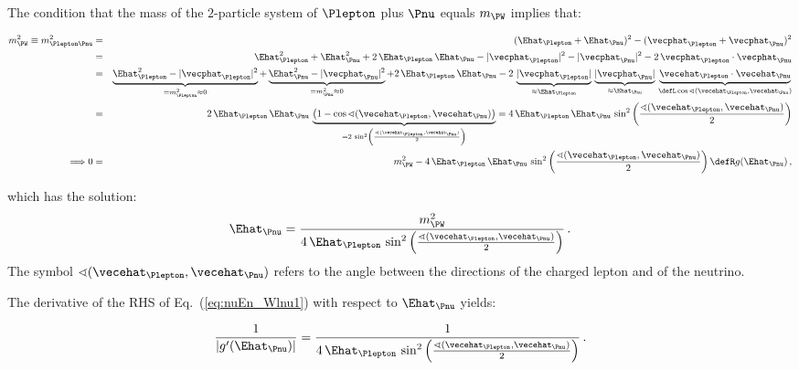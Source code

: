 The condition that the mass of the $2$-particle system of $\Plepton$ plus $\Pnu$ equals $m_{\PW}$ implies that:
\begin{linenowrapper}
\begin{eqnarray}
m_{\PW}^{2} \equiv m_{\Plepton\Pnu}^{2} 
 & = & ( \Ehat_{\Plepton} + \Ehat_{\Pnu} )^{2} - ( \vecphat_{\Plepton} + \vecphat_{\Pnu} )^{2} \nonumber \\
 & = & \Ehat_{\Plepton}^{2} + \Ehat_{\Pnu}^{2} + 2 \, \Ehat_{\Plepton} \, \Ehat_{\Pnu} 
- |\vecphat_{\Plepton}|^{2} - |\vecphat_{\Pnu}|^{2} - 2 \, \vecphat_{\Plepton} \cdot \vecphat_{\Pnu} \nonumber \\
 & = & \underbrace{\Ehat_{\Plepton}^{2} - |\vecphat_{\Plepton}|^{2}}_{= m_{\Plepton}^{2} \approx 0} 
+ \underbrace{\Ehat_{\Pnu}^{2} - |\vecphat_{\Pnu}|^{2}}_{= m_{\Pnu}^{2} \approx 0} 
+ 2 \, \Ehat_{\Plepton} \, \Ehat_{\Pnu} 
- 2 \, \underbrace{|\vecphat_{\Plepton}|}_{\approx \Ehat_{\Plepton}} \, \underbrace{|\vecphat_{\Pnu}|}_{\approx \Ehat_{\Pnu}} \, 
 \underbrace{\vecehat_{\Plepton} \cdot \vecehat_{\Pnu}}_{\defL \cos\sphericalangle(\vecehat_{\Plepton},\vecehat_{\Pnu})} \nonumber \\
 & = & 2 \, \Ehat_{\Plepton} \, \Ehat_{\Pnu} \, 
  \underbrace{\left(1 - \cos\sphericalangle(\vecehat_{\Plepton},\vecehat_{\Pnu})\right)}_{= 2 \, \sin^{2}\left(\frac{\sphericalangle(\vecehat_{\Plepton},\vecehat_{\Pnu})}{2}\right)} 
   = 4 \, \Ehat_{\Plepton} \, \Ehat_{\Pnu} \, \sin^{2}\left(\frac{\sphericalangle(\vecehat_{\Plepton},\vecehat_{\Pnu})}{2}\right) \nonumber \\
\Longrightarrow 0 & = & m_{\PW}^{2} - 4 \, \Ehat_{\Plepton} \, \Ehat_{\Pnu} \, \sin^{2}\left(\frac{\sphericalangle(\vecehat_{\Plepton},\vecehat_{\Pnu})}{2}\right)
  \defR g(\Ehat_{\Pnu}) \, ,
\label{eq:nuEn_Wlnu1}
\end{eqnarray}
\end{linenowrapper}
which has the solution:
\begin{equation}
\Ehat_{\Pnu} = \frac{m_{\PW}^{2}}{4 \, \Ehat_{\Plepton} \, \sin^{2}\left(\frac{\sphericalangle(\vecehat_{\Plepton},\vecehat_{\Pnu})}{2}\right)} \, .
\label{eq:nuEn_Wlnu2}
\end{equation}
The symbol $\sphericalangle(\vecehat_{\Plepton},\vecehat_{\Pnu})$ refers to the angle between the directions of the charged lepton and of the neutrino.

The derivative of the RHS of Eq.~(\ref{eq:nuEn_Wlnu1}) with respect to $\Ehat_{\Pnu}$ yields:
\begin{linenowrapper}
\begin{equation}
\frac{1}{|g^{\prime}(\Ehat_{\Pnu})|} 
 = \frac{1}{4 \, \Ehat_{\Plepton} \, \sin^{2}\left(\frac{\sphericalangle(\vecehat_{\Plepton},\vecehat_{\Pnu})}{2}\right)} \, . 
\label{eq:nuEn_Wlnu3}
\end{equation}
\end{linenowrapper}

